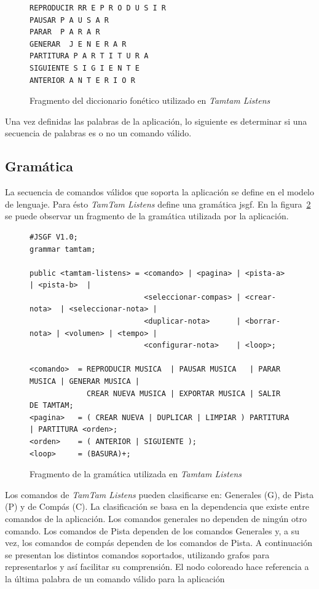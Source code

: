 \begin{figure}[H]
\begin{lstlisting}
REPRODUCIR RR E P R O D U S I R
PAUSAR P A U S A R
PARAR  P A R A R
GENERAR  J E N E R A R
PARTITURA P A R T I T U R A
SIGUIENTE S I G I E N T E
ANTERIOR A N T E R I O R
\end{lstlisting}
\caption{Fragmento del diccionario fon\'etico utilizado en \emph{Tamtam Listens}}
\label{figure:fragmento-dic}
\end{figure}

Una vez definidas las palabras de la aplicaci\'on, lo siguiente es determinar si una secuencia de palabras es o no un 
comando v\'alido.

\subsection{Gram\'atica}

La secuencia de comandos v\'alidos que soporta la aplicaci\'on se define en el modelo de lenguaje. Para \'esto
\emph{TamTam Listens} define una gram\'atica \gls{jsgf}. En la figura~\ref{figure:fragmento-gram} se puede observar
un fragmento de la gram\'atica utilizada por la aplicaci\'on.

\begin{figure}[H]
\begin{lstlisting}
#JSGF V1.0;
grammar tamtam;

public <tamtam-listens> = <comando> | <pagina> | <pista-a>     | <pista-b>  | 
                          <seleccionar-compas> | <crear-nota>  | <seleccionar-nota> | 
                          <duplicar-nota>      | <borrar-nota> | <volumen> | <tempo> | 
                          <configurar-nota>    | <loop>;

<comando>  = REPRODUCIR MUSICA  | PAUSAR MUSICA   | PARAR MUSICA | GENERAR MUSICA | 
             CREAR NUEVA MUSICA | EXPORTAR MUSICA | SALIR DE TAMTAM;
<pagina>   = ( CREAR NUEVA | DUPLICAR | LIMPIAR ) PARTITURA | PARTITURA <orden>;
<orden>    = ( ANTERIOR | SIGUIENTE );
<loop>     = (BASURA)+;
\end{lstlisting}
\caption{Fragmento de la gram\'atica utilizada en \emph{Tamtam Listens}}
\label{figure:fragmento-gram}
\end{figure} 

Los comandos de \emph{TamTam Listens} pueden clasificarse en: Generales (G), de Pista (P) y de Comp\'as (C). La clasificaci\'on
se basa en la dependencia que existe entre comandos de la aplicaci\'on. Los comandos generales no dependen de ning\'un otro comando.
Los comandos de Pista dependen de los comandos Generales y, a su vez, los comandos de comp\'as dependen de los comandos de Pista.
A continuaci\'on se presentan los distintos comandos soportados, utilizando grafos para representarlos y as\'i facilitar
su comprensi\'on. El nodo coloreado hace referencia a la \'ultima palabra de un comando v\'alido para la aplicaci\'on

